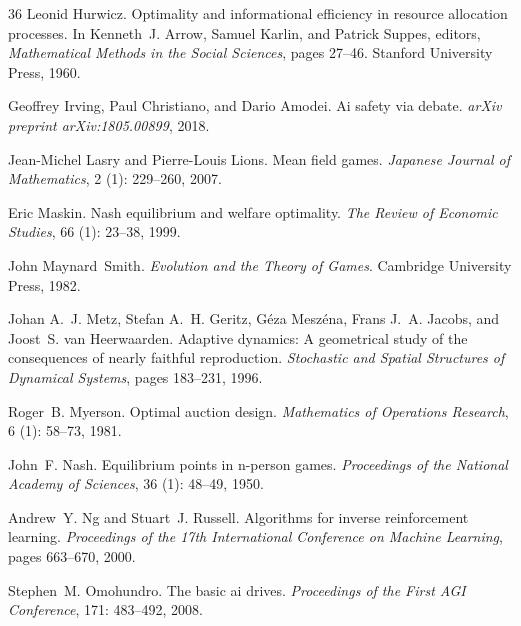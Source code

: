 \documentclass[12pt]{article}
\begin{document}
\begin{thebibliography}{36}
Leonid Hurwicz.
\newblock Optimality and informational efficiency in resource allocation
  processes.
\newblock In Kenneth~J. Arrow, Samuel Karlin, and Patrick Suppes, editors,
  \emph{Mathematical Methods in the Social Sciences}, pages 27--46. Stanford
  University Press, 1960.

Geoffrey Irving, Paul Christiano, and Dario Amodei.
\newblock Ai safety via debate.
\newblock \emph{arXiv preprint arXiv:1805.00899}, 2018.

Jean-Michel Lasry and Pierre-Louis Lions.
\newblock Mean field games.
\newblock \emph{Japanese Journal of Mathematics}, 2 (1):
  229--260, 2007.

Eric Maskin.
\newblock Nash equilibrium and welfare optimality.
\newblock \emph{The Review of Economic Studies}, 66 (1):
  23--38, 1999.

John Maynard~Smith.
\newblock \emph{Evolution and the Theory of Games}.
\newblock Cambridge University Press, 1982.

Johan A.~J. Metz, Stefan A.~H. Geritz, G{\'e}za Mesz{\'e}na, Frans J.~A.
  Jacobs, and Joost~S. van Heerwaarden.
\newblock Adaptive dynamics: A geometrical study of the consequences of nearly
  faithful reproduction.
\newblock \emph{Stochastic and Spatial Structures of Dynamical Systems}, pages
  183--231, 1996.

Roger~B. Myerson.
\newblock Optimal auction design.
\newblock \emph{Mathematics of Operations Research}, 6 (1):
  58--73, 1981.

John~F. Nash.
\newblock Equilibrium points in n-person games.
\newblock \emph{Proceedings of the National Academy of Sciences}, 36
  (1): 48--49, 1950.

Andrew~Y. Ng and Stuart~J. Russell.
\newblock Algorithms for inverse reinforcement learning.
\newblock \emph{Proceedings of the 17th International Conference on Machine
  Learning}, pages 663--670, 2000.

Stephen~M. Omohundro.
\newblock The basic ai drives.
\newblock \emph{Proceedings of the First AGI Conference}, 171:
  483--492, 2008.


\end{thebibliography}
\end{document}
